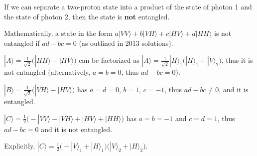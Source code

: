 If we can separate a two-proton state into a product of the state of photon 1 and the state of photon 2, then the state is \textbf{not} entangled.

Mathematically, a state in the form $a|VV\rangle + b|VH\rangle + c|HV\rangle + d|HH\rangle$ is not entangled if $ad-bc=0$ (as outlined in 2013 solutions).

$|A\rangle = \frac{1}{\sqrt{2}}\big( |HH\rangle - |HV\rangle \big)$ can be factorized as $|A\rangle = \frac{1}{\sqrt{2}} |H\rangle_1 \big( |H\rangle_1 + |V\rangle_2 \big)$, thus it is not entangled (alternatively, $a=b=0$, thus $ad-bc=0$).

$|B\rangle = \frac{1}{\sqrt{2}}\big( |VH\rangle - |HV\rangle \big)$ has $a=d=0$, $b=1$, $c=-1$, thus $ad-bc \neq 0$, and it is entangled.

$|C\rangle = \frac{1}{2} \big( -|VV\rangle - |VH\rangle + |HV\rangle + |HH\rangle \big)$ has $a=b=-1$ and $c=d=1$, thus $ad-bc = 0$ and it is not entangled.

Explicitly, $|C\rangle = \frac{1}{2} \big( -|V\rangle_1 + |H\rangle_1 \big) \big( |V\rangle_2 + |H\rangle_2 \big)$.
